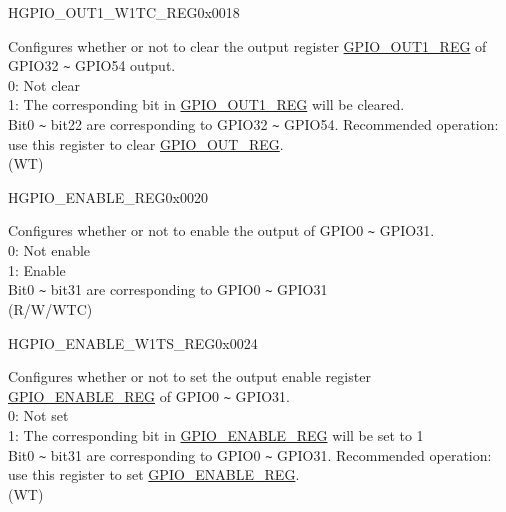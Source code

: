 \begin{register}{H}{GPIO\_OUT1\_W1TC\_REG}{0x0018}\label{regdesc:GPIOOUT1W1TCREG}
%
%
\regnewline%
\begin{regdesc}\begin{reglist}
\label{fielddesc:GPIOOUT1W1TC}\item [GPIO\_OUT1\_W1TC] Configures whether or not to clear the output register \hyperref[regdesc:GPIOOUT1REG]{GPIO\_OUT1\_REG} of GPIO32 \verb+~+ GPIO54 output.\\
0: Not clear\\
1: The corresponding bit in \hyperref[regdesc:GPIOOUT1REG]{GPIO\_OUT1\_REG} will be cleared.\\
Bit0 \verb+~+ bit22 are corresponding to GPIO32 \verb+~+ GPIO54.
Recommended operation: use this register to clear \hyperref[regdesc:GPIOOUT1REG]{GPIO\_OUT\_REG}. \\
(WT)
\end{reglist}\end{regdesc}
\end{register}


\begin{register}{H}{GPIO\_ENABLE\_REG}{0x0020}\label{regdesc:GPIOENABLEREG}
%
\regnewline%
\begin{regdesc}\begin{reglist}
\label{fielddesc:GPIOENABLEDATA}\item [GPIO\_ENABLE\_DATA] Configures whether or not to enable the output of GPIO0 \verb+~+ GPIO31.\\
0: Not enable\\
1: Enable\\
Bit0 \verb+~+ bit31 are corresponding to GPIO0 \verb+~+ GPIO31 \\
(R/W/WTC)
\end{reglist}\end{regdesc}
\end{register}


\begin{register}{H}{GPIO\_ENABLE\_W1TS\_REG}{0x0024}\label{regdesc:GPIOENABLEW1TSREG}
%
\regnewline%
\begin{regdesc}\begin{reglist}
\label{fielddesc:GPIOENABLEW1TS}\item [GPIO\_ENABLE\_W1TS] Configures whether or not to set the output enable register \hyperref[regdesc:GPIOENABLEREG]{GPIO\_ENABLE\_REG} of GPIO0 \verb+~+ GPIO31.\\
0: Not set\\
1: The corresponding bit in \hyperref[regdesc:GPIOENABLEREG]{GPIO\_ENABLE\_REG} will be set to 1\\
Bit0 \verb+~+ bit31 are corresponding to GPIO0 \verb+~+ GPIO31. Recommended operation: use this register to set \hyperref[regdesc:GPIOENABLEREG]{GPIO\_ENABLE\_REG}.\\
(WT)
\end{reglist}\end{regdesc}
\end{register}


